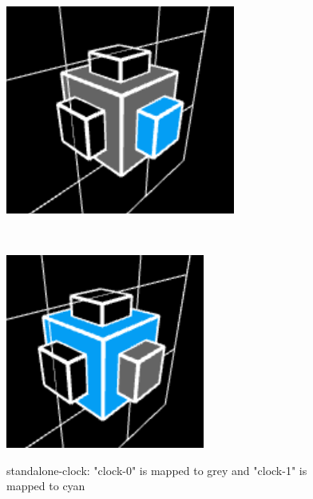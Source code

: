\documentclass[letterpaper,11pt]{article}
\begin{document}
\begin{figure}[h!tbp]
	\centering
	\begin{minipage}[b]{0.2\textwidth} 
		\includegraphics[width=\textwidth]{figures/0-clock.png}
				\label{fig:2a}
	\end{minipage}
	~ %
	\begin{minipage}[b]{0.2\textwidth} 
		\includegraphics[width=\textwidth]{figures/1-clock.png}
				\label{fig:2b}
	\end{minipage}
	\caption{standalone-clock: "clock-0" is mapped to grey and "clock-1" is mapped to cyan}
	\label{fig:2}
	\end{figure}
\end{document}
